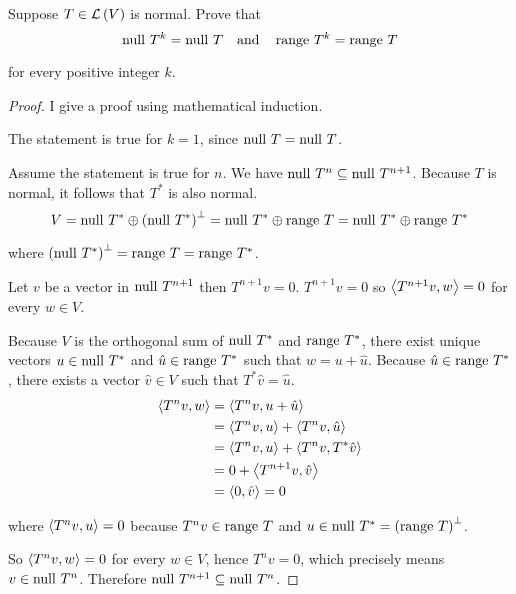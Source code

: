 \begin{exercise}\label{chapter7:sectionA:exercise27}
    Suppose $T\in\mathcal{L}\left({V}\right)$ is normal. Prove that
    \[
        \operatorname{null}\,{T^{k}} = \operatorname{null}\,{T}\quad\text{and}\quad \operatorname{range}\,{T^{k}} = \operatorname{range}\,{T}
    \]

    for every positive integer $k$.
\end{exercise}

\begin{proof}
    I give a proof using mathematical induction.

    The statement is true for $k = 1$, since $\operatorname{null}\,{T} = \operatorname{null}\,{T}$.

    Assume the statement is true for $n$. We have $\operatorname{null}\,{T^{n}}\subseteq\operatorname{null}\,{T^{n+1}}$. Because $T$ is normal, it follows that $T^{*}$ is also normal.
    \[
        V = \operatorname{null}\,{T^{*}}\oplus{(\operatorname{null}\,{T^{*}})}^{\bot} = \operatorname{null}\,{T^{*}}\oplus\operatorname{range}\,{T} = \operatorname{null}\,{T^{*}}\oplus\operatorname{range}\,{T^{*}}
    \]

    where ${(\operatorname{null}\,{T^{*}})}^{\bot} = \operatorname{range}\,{T} = \operatorname{range}\,{T^{*}}$.

    Let $v$ be a vector in $\operatorname{null}\,{T^{n+1}}$ then $T^{n+1}v = 0$. $T^{n+1}v = 0$ so $\left\langle{T^{n+1}v, w}\right\rangle = 0$ for every $w\in V$.

    Because $V$ is the orthogonal sum of $\operatorname{null}\,{T^{*}}$ and $\operatorname{range}\,{T^{*}}$, there exist unique vectors $u\in \operatorname{null}\,{T^{*}}$ and $\hat{u}\in\operatorname{range}\,{T^{*}}$ such that $w = u + \hat{u}$. Because $\hat{u}\in \operatorname{range}\,{T^{*}}$, there exists a vector $\hat{v}\in V$ such that $T^{*}\hat{v} = \hat{u}$.
    \begin{align*}
        \left\langle{T^{n}v, w}\right\rangle & = \left\langle{T^{n}v, u + \hat{u}}\right\rangle \\
                              & = \left\langle{T^{n}v, u}\right\rangle + \left\langle{T^{n}v, \hat{u}}\right\rangle \\
                              & = \left\langle{T^{n}v, u}\right\rangle + \left\langle{T^{n}v, T^{*}\hat{v}}\right\rangle \\
                              & = 0 + \left\langle{T^{n+1}v, \hat{v}}\right\rangle \\
                              & = \left\langle{0, \hat{v}}\right\rangle = 0
    \end{align*}

    where $\left\langle{T^{n}v, u}\right\rangle = 0$ because $T^{n}v\in\operatorname{range}\,{T}$ and $u\in\operatorname{null}\,{T^{*}} = {(\operatorname{range}\,{T})}^{\bot}$.

    So $\left\langle{T^{n}v, w}\right\rangle = 0$ for every $w\in V$, hence $T^{n}v = 0$, which precisely means $v\in\operatorname{null}\,{T^{n}}$. Therefore $\operatorname{null}\,{T^{n+1}}\subseteq \operatorname{null}\,{T^{n}}$.


\end{proof}

